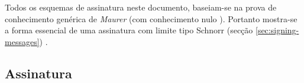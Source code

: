 Todos os esquemas de assinatura neste documento, baseiam-se na prova de conhecimento genérica de {\em Maurer} (com conhecimento nulo \cite{simple-zk-proof-maurer}). Portanto mostra-se a forma essencial de uma assinatura com limite tipo Schnorr (secção \ref{sec:signing-messages}) \cite{old-multisig-mrl-note}.
  


\subsection*{Assinatura}

